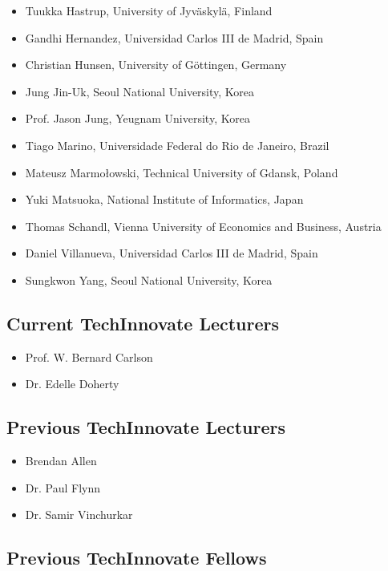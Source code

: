 \documentclass[10pt,a4paper]{res} %
\begin{document}
\begin{resume}
\begin{itemize}
\item Tuukka Hastrup, University of Jyv\"{a}skyl\"{a}, Finland
\item Gandhi Hernandez, Universidad Carlos III de Madrid, Spain
\item Christian Hunsen, University of G\"{o}ttingen, Germany
\item Jung Jin-Uk, Seoul National University, Korea
\item Prof. Jason Jung, Yeugnam University, Korea
\item Tiago Marino, Universidade Federal do Rio de Janeiro, Brazil
\item Mateusz Marmo{\l}owski, Technical University of Gdansk, Poland
\item Yuki Matsuoka, National Institute of Informatics, Japan
\item Thomas Schandl, Vienna University of Economics and Business, Austria
\item Daniel Villanueva, Universidad Carlos III de Madrid, Spain
\item Sungkwon Yang, Seoul National University, Korea
\end{itemize}

\subsection*{Current TechInnovate Lecturers}

\begin{itemize} \itemsep -2pt
\item Prof. W. Bernard Carlson
\item Dr. Edelle Doherty
\end{itemize}

\subsection*{Previous TechInnovate Lecturers}

\begin{itemize} \itemsep -2pt
\item Brendan Allen
\item Dr. Paul Flynn
\item Dr. Samir Vinchurkar
\end{itemize}

\subsection*{Previous TechInnovate Fellows}


\end{resume}
\end{document}
